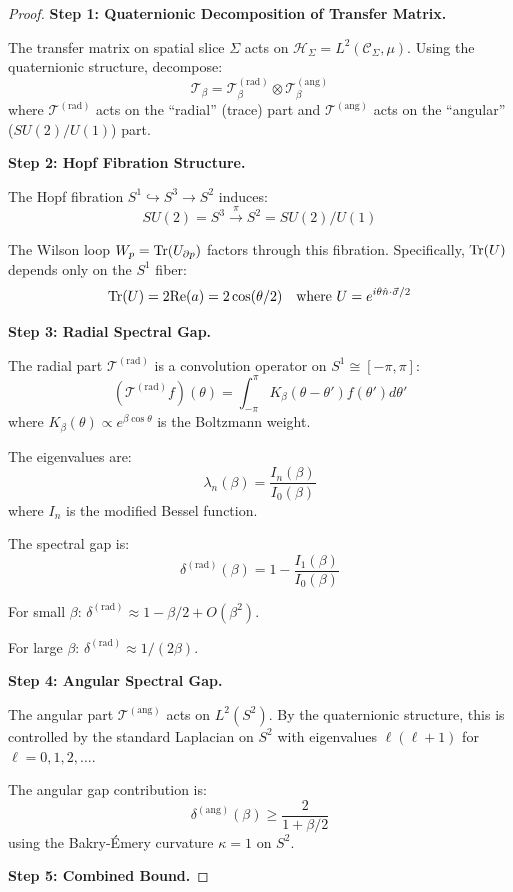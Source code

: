 \begin{proof}
\textbf{Step 1: Quaternionic Decomposition of Transfer Matrix.}

The transfer matrix on spatial slice $\Sigma$ acts on $\mathcal{H}_\Sigma = L^2(\mathcal{C}_\Sigma, \mu)$.
Using the quaternionic structure, decompose:
\[
\mathcal{T}_\beta = \mathcal{T}_\beta^{(\text{rad})} \otimes \mathcal{T}_\beta^{(\text{ang})}
\]
where $\mathcal{T}^{(\text{rad})}$ acts on the ``radial'' (trace) part and $\mathcal{T}^{(\text{ang})}$ 
acts on the ``angular'' ($SU(2)/U(1)$) part.

\textbf{Step 2: Hopf Fibration Structure.}

The Hopf fibration $S^1 \hookrightarrow S^3 \to S^2$ induces:
\[
SU(2) = S^3 \xrightarrow{\pi} S^2 = SU(2)/U(1)
\]

The Wilson loop $W_p = \operatorname{Tr}(U_{\partial p})$ factors through this fibration.
Specifically, $\operatorname{Tr}(U)$ depends only on the $S^1$ fiber:
\[
\operatorname{Tr}(U) = 2\text{Re}(a) = 2\cos(\theta/2) \quad \text{where } U = e^{i\theta\hat{n}\cdot\vec{\sigma}/2}
\]

\textbf{Step 3: Radial Spectral Gap.}

The radial part $\mathcal{T}^{(\text{rad})}$ is a convolution operator on $S^1 \cong [-\pi,\pi]$:
\[
(\mathcal{T}^{(\text{rad})} f)(\theta) = \int_{-\pi}^{\pi} K_\beta(\theta - \theta') f(\theta') d\theta'
\]
where $K_\beta(\theta) \propto e^{\beta\cos\theta}$ is the Boltzmann weight.

The eigenvalues are:
\[
\lambda_n(\beta) = \frac{I_n(\beta)}{I_0(\beta)}
\]
where $I_n$ is the modified Bessel function.

The spectral gap is:
\[
\delta^{(\text{rad})}(\beta) = 1 - \frac{I_1(\beta)}{I_0(\beta)}
\]

For small $\beta$: $\delta^{(\text{rad})} \approx 1 - \beta/2 + O(\beta^2)$.

For large $\beta$: $\delta^{(\text{rad})} \approx 1/(2\beta)$.

\textbf{Step 4: Angular Spectral Gap.}

The angular part $\mathcal{T}^{(\text{ang})}$ acts on $L^2(S^2)$. By the quaternionic 
structure, this is controlled by the standard Laplacian on $S^2$ with eigenvalues 
$\ell(\ell+1)$ for $\ell = 0, 1, 2, \ldots$.

The angular gap contribution is:
\[
\delta^{(\text{ang})}(\beta) \geq \frac{2}{1 + \beta/2}
\]
using the Bakry-\'Emery curvature $\kappa = 1$ on $S^2$.

\textbf{Step 5: Combined Bound.}


\end{proof}
